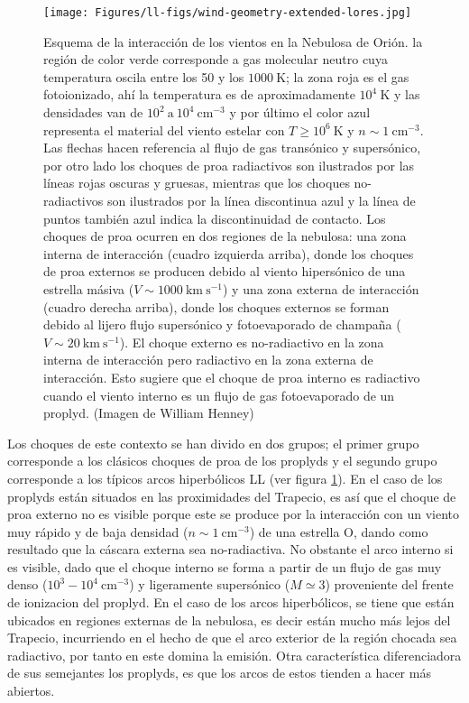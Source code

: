 \documentclass{article}
\newcommand\U[1]{\ensuremath{\mathrm{#1}}}
\newcommand\K{\U{K}}
\newcommand\cm{\U{cm}}
\begin{document}
\begin{figure}
  \centering
  \texttt{[image: Figures/ll-figs/wind-geometry-extended-lores.jpg]}
  \caption{Esquema de la interacción de los vientos en la Nebulosa de Orión. la región de color verde corresponde a gas molecular neutro cuya temperatura oscila entre los 50 y los \(1000~\K\); la zona roja es el gas fotoionizado, ahí la temperatura es de aproximadamente \(10^{4}~\K\) y las densidades van de \(10^{2} ~\text{a}~10^{4} ~\cm^{-3}\) y por último el color azul representa el material del viento estelar con \(T \geq 10^{6}~\K\) y \(n \sim 1~\cm^{-3}\). Las flechas hacen referencia al flujo de gas transónico y supersónico, por otro lado los choques de proa radiactivos son ilustrados por las líneas rojas oscuras y gruesas, mientras que los choques no-radiactivos son ilustrados por la línea discontinua azul y la línea de puntos también azul indica la discontinuidad de contacto. Los choques de proa ocurren en dos regiones de la nebulosa: una zona interna de interacción (cuadro izquierda arriba), donde los choques de proa externos se producen debido al viento hipersónico de una estrella másiva (\(V \sim 1000~\text{km}~\text{s}^{-1}\)) y una zona externa de interacción (cuadro derecha arriba), donde los  choques externos se forman debido al lijero  flujo supersónico y fotoevaporado de champaña (\(V \sim 20~\text{km}~\text{s}^{-1}\)). El choque externo es no-radiactivo en la zona interna de interacción pero radiactivo en la zona externa de interacción. Esto sugiere que el choque de proa interno es radiactivo cuando el viento interno es un flujo de gas fotoevaporado de un proplyd. (Imagen de William Henney) }
  \label{fig:esquema-interraccion-vientos}
\end{figure}

Los choques de este contexto se han divido en dos grupos; el primer grupo corresponde a los clásicos choques de proa de los proplyds \citep{Robberto:2005, Bally:1998a}  y el segundo grupo corresponde a los típicos arcos hiperbólicos LL (ver figura \ref{fig:esquema-interraccion-vientos}). En el caso de los proplyds están situados en las proximidades del Trapecio, es así que el choque de proa externo no es visible porque este se produce por la interacción con un viento muy rápido y de baja densidad (\(n \sim 1 ~\cm^{-3}\)) de una estrella O, dando como resultado que la cáscara externa sea no-radiactiva. No obstante el arco interno si es visible, dado que el choque interno se forma a partir de un flujo de gas muy denso (\(10^{3}-10^{4}~\text{cm}^{-3}\)) y ligeramente supersónico (\(M \simeq 3\)) proveniente del frente de ionizacion del proplyd. En el caso de los arcos hiperbólicos, se tiene que están ubicados en regiones externas de la nebulosa, es decir están mucho más lejos del Trapecio, incurriendo en el hecho de que el arco exterior de la región chocada sea radiactivo, por tanto en este domina la emisión. Otra característica diferenciadora de sus semejantes los proplyds, es que los arcos de estos tienden a hacer más abiertos.\\ 
\end{document}
